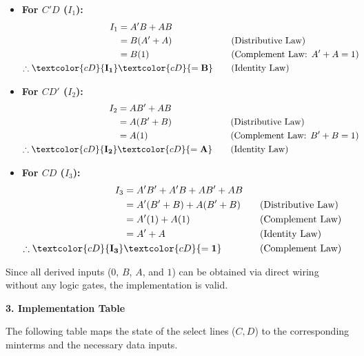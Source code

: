 \documentclass[12pt,a3paper]{article}
\begin{document}
\begin{enumerate}
\begin{tcolorbox}[enhanced,breakable,ansbox,colback=cD!4,colframe=cD,boxrule=0.8pt,arc=5pt,title={\textbf{Answer}},fonttitle=\bfseries\color{white},colbacktitle=cD]
\begin{itemize}
    \item \textbf{For $C'D$ ($I_1$):} \\
    \begin{align*}
    I_1 &= A'B + AB \\
        &= B(A' + A) \quad &&\text{(Distributive Law)} \\
        &= B(1) \quad &&\text{(Complement Law: $A' + A = 1$)} \\
        \therefore \textcolor{cD}{\mathbf{I_1}} &\textcolor{cD}{\mathbf{= B}} \quad &&\text{(Identity Law)}
    \end{align*}

    \item \textbf{For $CD'$ ($I_2$):} \\
    \begin{align*}
    I_2 &= AB' + AB \\
        &= A(B' + B) \quad &&\text{(Distributive Law)} \\
        &= A(1) \quad &&\text{(Complement Law: $B' + B = 1$)} \\
        \therefore \textcolor{cD}{\mathbf{I_2}} &\textcolor{cD}{\mathbf{= A}} \quad &&\text{(Identity Law)}
    \end{align*}

    \item \textbf{For $CD$ ($I_3$):} \\
    \begin{align*}
    I_3 &= A'B' + A'B + AB' + AB \\
        &= A'(B' + B) + A(B' + B) \quad &&\text{(Distributive Law)} \\
        &= A'(1) + A(1) \quad &&\text{(Complement Law)} \\
        &= A' + A \quad &&\text{(Identity Law)} \\
        \therefore \textcolor{cD}{\mathbf{I_3}} &\textcolor{cD}{\mathbf{= 1}} \quad &&\text{(Complement Law)}
    \end{align*}
\end{itemize}

Since all derived inputs ($0$, $B$, $A$, and $1$) can be obtained via direct wiring without any logic gates, the implementation is valid.

\vspace{1em}
\textbf{\large 3. Implementation Table}

The following table maps the state of the select lines ($C, D$) to the corresponding minterms and the necessary data inputs.


\end{tcolorbox}
\end{enumerate}
\end{document}
